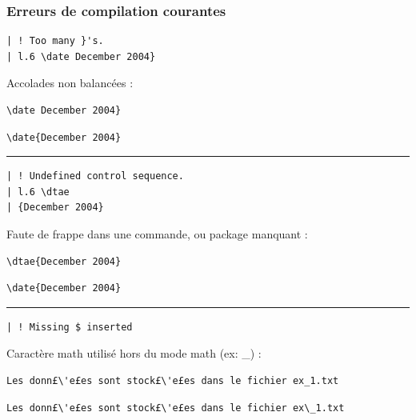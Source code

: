 \documentclass{beamer}
\begin{document}
\begin{frame}[fragile]
  \frametitle{Erreurs de compilation courantes}

\begin{lstlisting}[language={},backgroundcolor=\color{gray!30}]
| ! Too many }'s.
| l.6 \date December 2004}
\end{lstlisting}
Accolades non balancées :
\begin{lstlisting}[backgroundcolor=\color{red!20}]
\date December 2004}
\end{lstlisting}\vspace*{-.85em}
\begin{lstlisting}[backgroundcolor=\color{green!20}]
\date{December 2004}
\end{lstlisting}

\pause
\hrule
\medskip
\begin{lstlisting}[language={},backgroundcolor=\color{gray!30}]
| ! Undefined control sequence.
| l.6 \dtae
| {December 2004}
\end{lstlisting}
Faute de frappe dans une commande, ou package manquant :
\begin{lstlisting}[backgroundcolor=\color{red!20}]
\dtae{December 2004}
\end{lstlisting}\vspace*{-.85em}
\begin{lstlisting}[backgroundcolor=\color{green!20}]
\date{December 2004}
\end{lstlisting}

\pause
\hrule
\medskip
\begin{lstlisting}[language={},backgroundcolor=\color{gray!30}]
| ! Missing $ inserted
\end{lstlisting}
Caractère math utilisé hors du mode math (ex: \_) :
\begin{lstlisting}[backgroundcolor=\color{red!20}]
Les donn£\'e£es sont stock£\'e£es dans le fichier ex_1.txt
\end{lstlisting}\vspace*{-.85em}
\begin{lstlisting}[backgroundcolor=\color{green!20}]
Les donn£\'e£es sont stock£\'e£es dans le fichier ex\_1.txt
\end{lstlisting}

\end{frame}


\end{document}
